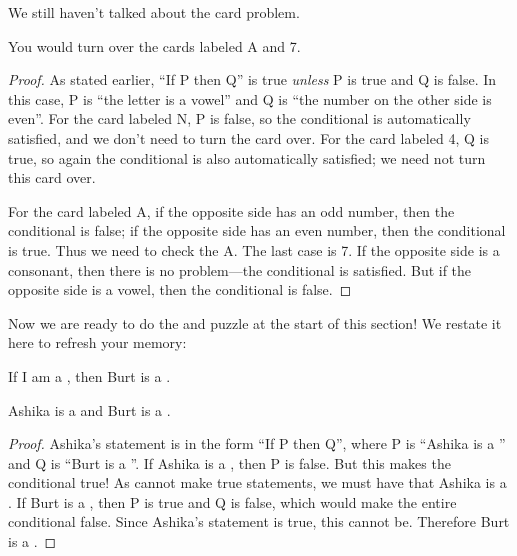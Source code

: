 \documentclass{tufte-book}
\begin{document}
We still haven't talked about the card problem. 

\begin{claim}
  You would turn over the cards labeled A and 7.
\end{claim}

\begin{proof}
  As stated earlier, ``If P then Q'' is true \emph{unless} P is true and Q is false. In this case, P is ``the letter is a vowel'' and Q is ``the number on the other side is even''. For the card labeled N, P is false, so the conditional is automatically satisfied, and we don't need to turn the card over. For the card labeled 4, Q is true, so again the conditional is also automatically satisfied; we need not turn this card over.

  For the card labeled A, if the opposite side has an odd number, then the conditional is false; if the opposite side has an even number, then the conditional is true. Thus we need to check the A. The last case is 7. If the opposite side is a consonant, then there is no problem---the conditional is satisfied. But if the opposite side is a vowel, then the conditional is false.
\end{proof}

Now we are ready to do the \knights and \knaves puzzle at the start of this section! We restate it here to refresh your memory:
  \begin{dialogue}
     If I am a \knight, then Burt is a \knave.
  \end{dialogue}

  \begin{claim}
    Ashika is a \knight and Burt is a \knave.
  \end{claim}

  \begin{proof}
    Ashika's statement is in the form ``If P then Q'', where P is ``Ashika is a \knight'' and Q is ``Burt is a \knave''. If Ashika is a \knave, then P is false. But this makes the conditional true! As \knaves cannot make true statements, we must have that Ashika is a \knight. If Burt is a \knight, then P is true and Q is false, which would make the entire conditional false. Since Ashika's statement is true, this cannot be. Therefore Burt is a \knave.
  \end{proof}
\end{document}
